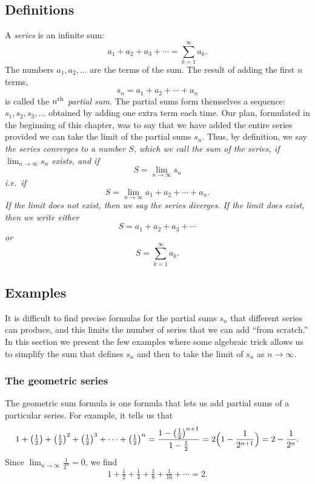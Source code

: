 \subsection{Definitions} %
A \emph{series} is an infinite sum:
\[
  a_1+a_2+a_3+\cdots = \sum_{k=1}^\infty a_k.
\]
The numbers $a_1, a_2, \ldots$ are the terms of the sum.  The result of adding
the first $n$ terms, 
\[
  s_n = a_1+a_2+\cdots + a_n
\]
is called the \emph{$n^{\rm th}$ partial sum.}
The partial sums form themselves a sequence: $s_1, s_2, s_3, \ldots$ obtained by adding
one extra term each time.  Our plan, formulated in the beginning of this
chapter, was to say that we have added the entire series provided we can take
the limit of the partial sums $s_n$.  
Thus, by definition, we say \itshape%
the series converges to a number $S$, which we call the \emph{sum of the series,} if
$\lim_{n\to\infty} s_n$ exists, and if
\[
  S = \lim_{n\to\infty} s_n
\]
i.e.~if
\[
  S = \lim_{n\to\infty}  a_1+a_2+\cdots + a_n.
\]\upshape%
If the limit does not exist, then we say the series \emph{diverges.}
If the limit does exist, then we write either
\[
  S = a_1+a_2+a_3+\cdots 
\]
or
\[
  S = \sum_{k=1}^\infty a_k.
\]

\subsection{Examples}  %
It is difficult to find precise formulas for the partial sums $s_n$ that
different series can produce, and this limits the number of series that we can add
``from scratch.''  In this section we present the few examples where some
algebraic trick allows us to simplify the sum that defines $s_n$ and then to
take the limit of $s_n$ as $n\to\infty$.
\subsubsection*{The geometric series}
The geometric sum formula is one formula that lets us add partial sums of a
particular series. For example, it tells us that
\[
  1 +\bigl(\tfrac12\bigr) + \bigl(\tfrac12\bigr)^2 + \bigl(\tfrac12\bigr)^3 + 
  \cdots +
  \bigl(\tfrac12\bigr)^n = \frac{1 - \bigl(\frac{1}{2}\bigr)^{n+1} }{1-\frac12}
  = 2\Bigl(1-\frac1{2^{n+1}}\Bigr)
  =2 - \frac1{2^n}.
\]
Since $\lim_{n\to\infty} \frac{1}{2^{n}} = 0$, we find
\[
  1 + \tfrac12 + \tfrac14 + \tfrac 18 +\tfrac1{16} + \cdots  = 2.
\]

